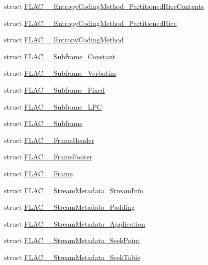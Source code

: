 \begin{DoxyCompactItemize}
\item 
struct \hyperlink{struct_f_l_a_c_____entropy_coding_method___partitioned_rice_contents}{F\+L\+A\+C\+\_\+\+\_\+\+Entropy\+Coding\+Method\+\_\+\+Partitioned\+Rice\+Contents}
\item 
struct \hyperlink{struct_f_l_a_c_____entropy_coding_method___partitioned_rice}{F\+L\+A\+C\+\_\+\+\_\+\+Entropy\+Coding\+Method\+\_\+\+Partitioned\+Rice}
\item 
struct \hyperlink{struct_f_l_a_c_____entropy_coding_method}{F\+L\+A\+C\+\_\+\+\_\+\+Entropy\+Coding\+Method}
\item 
struct \hyperlink{struct_f_l_a_c_____subframe___constant}{F\+L\+A\+C\+\_\+\+\_\+\+Subframe\+\_\+\+Constant}
\item 
struct \hyperlink{struct_f_l_a_c_____subframe___verbatim}{F\+L\+A\+C\+\_\+\+\_\+\+Subframe\+\_\+\+Verbatim}
\item 
struct \hyperlink{struct_f_l_a_c_____subframe___fixed}{F\+L\+A\+C\+\_\+\+\_\+\+Subframe\+\_\+\+Fixed}
\item 
struct \hyperlink{struct_f_l_a_c_____subframe___l_p_c}{F\+L\+A\+C\+\_\+\+\_\+\+Subframe\+\_\+\+L\+PC}
\item 
struct \hyperlink{struct_f_l_a_c_____subframe}{F\+L\+A\+C\+\_\+\+\_\+\+Subframe}
\item 
struct \hyperlink{struct_f_l_a_c_____frame_header}{F\+L\+A\+C\+\_\+\+\_\+\+Frame\+Header}
\item 
struct \hyperlink{struct_f_l_a_c_____frame_footer}{F\+L\+A\+C\+\_\+\+\_\+\+Frame\+Footer}
\item 
struct \hyperlink{struct_f_l_a_c_____frame}{F\+L\+A\+C\+\_\+\+\_\+\+Frame}
\item 
struct \hyperlink{struct_f_l_a_c_____stream_metadata___stream_info}{F\+L\+A\+C\+\_\+\+\_\+\+Stream\+Metadata\+\_\+\+Stream\+Info}
\item 
struct \hyperlink{struct_f_l_a_c_____stream_metadata___padding}{F\+L\+A\+C\+\_\+\+\_\+\+Stream\+Metadata\+\_\+\+Padding}
\item 
struct \hyperlink{struct_f_l_a_c_____stream_metadata___application}{F\+L\+A\+C\+\_\+\+\_\+\+Stream\+Metadata\+\_\+\+Application}
\item 
struct \hyperlink{struct_f_l_a_c_____stream_metadata___seek_point}{F\+L\+A\+C\+\_\+\+\_\+\+Stream\+Metadata\+\_\+\+Seek\+Point}
\item 
struct \hyperlink{struct_f_l_a_c_____stream_metadata___seek_table}{F\+L\+A\+C\+\_\+\+\_\+\+Stream\+Metadata\+\_\+\+Seek\+Table}

\end{DoxyCompactItemize}

